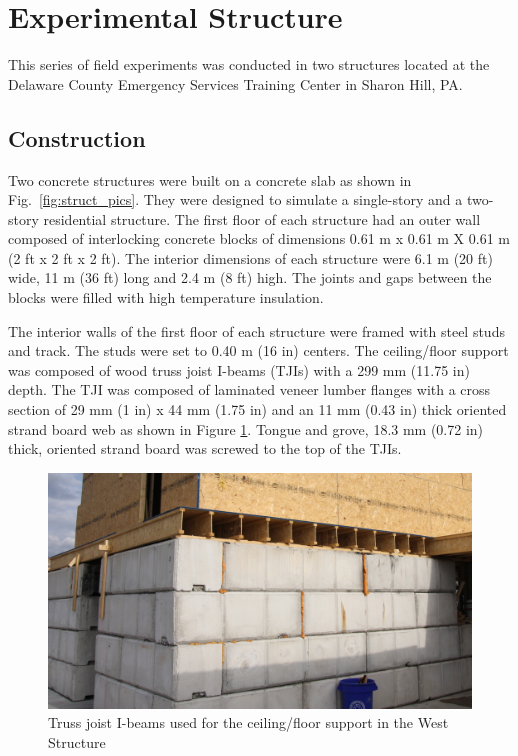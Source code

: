 \documentclass[12pt,oneside]{book}
\begin{document}
\section{Experimental Structure}
\label{sec:Experimental_Structure}
This series of field experiments was conducted in two structures located at the Delaware County Emergency Services Training Center in Sharon Hill, PA. 

\subsection{Construction}
\label{sec:Construction}
Two concrete structures were built on a concrete slab as shown in Fig.~\ref{fig:struct_pics}. They were designed to simulate a single-story and a two-story residential structure. The first floor of each structure had an outer wall composed of interlocking concrete blocks of dimensions 0.61 m x 0.61 m X 0.61 m (2 ft x 2 ft x 2 ft). The interior dimensions of each structure were 6.1 m (20 ft) wide, 11 m (36 ft) long and 2.4 m (8 ft) high. The joints and gaps between the blocks were filled with high temperature insulation.

The interior walls of the first floor of each structure were framed with steel studs and track. The studs were set to 0.40 m (16 in) centers. The ceiling/floor support was composed of wood truss joist I-beams (TJIs) with a 299 mm (11.75 in) depth. The TJI was composed of laminated veneer lumber flanges with a cross section of 29 mm (1 in) x 44 mm (1.75 in) and an 11 mm (0.43 in) thick oriented strand board web as shown in Figure \ref{fig:TJI}. Tongue and grove, 18.3 mm (0.72 in) thick, oriented strand board was screwed to the top of the TJIs.

\begin{figure}[!ht]
\includegraphics[width=6in]{../Pictures/TJI_support}
\caption[Truss Joist I-Beams]{Truss joist I-beams used for the ceiling/floor support in the West Structure}
\label{fig:TJI}
\end{figure}
\end{document}
